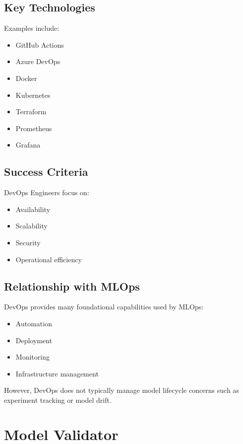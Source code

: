 \subsection{Key Technologies}

Examples include:

\begin{itemize}
    \item GitHub Actions
    \item Azure DevOps
    \item Docker
    \item Kubernetes
    \item Terraform
    \item Prometheus
    \item Grafana
\end{itemize}

\subsection{Success Criteria}

DevOps Engineers focus on:

\begin{itemize}
    \item Availability
    \item Scalability
    \item Security
    \item Operational efficiency
\end{itemize}

\subsection{Relationship with MLOps}

DevOps provides many foundational capabilities used by MLOps:

\begin{itemize}
    \item Automation
    \item Deployment
    \item Monitoring
    \item Infrastructure management
\end{itemize}

However, DevOps does not typically manage model lifecycle concerns such as experiment tracking or model drift.

\section{Model Validator}

